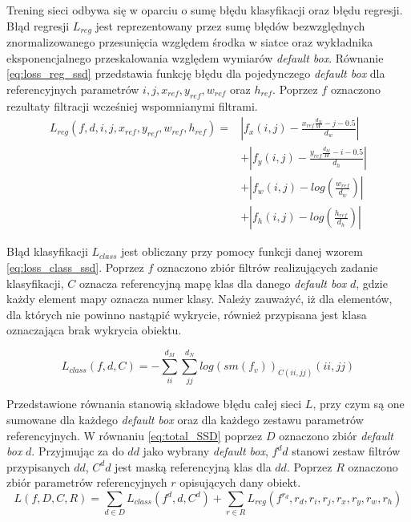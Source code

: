 Trening sieci odbywa się w oparciu o sumę błędu klasyfikacji oraz błędu regresji.
Błąd regresji $L_{reg}$ jest reprezentowany przez sumę błędów bezwzględnych znormalizowanego przesunięcia względem środka w siatce oraz wykładnika eksponencjalnego przeskalowania względem wymiarów \emph{default box}. 
Równanie \eqref{eq:loss_reg_ssd} przedstawia funkcję błędu dla pojedynczego \emph{default box} dla referencyjnych parametrów $i, j, x_{ref}, y_{ref}, w_{ref}$ oraz $h_{ref}$.
Poprzez $f$ oznaczono rezultaty filtracji wcześniej wspomnianymi filtrami.
\begin{equation}
\begin{aligned}
L_{reg}(f, d, i, j, x_{ref}, y_{ref}, w_{ref}, h_{ref}) 
=& |f_x(i,j) - \frac{x_{ref}\frac{d_N}{W} - j - 0.5}{d_w}| \\
&+ |f_y(i,j) - \frac{y_{ref}\frac{d_M}{H} - i - 0.5}{d_h}| \\
&+ |f_w(i,j) - log(\frac{w_{ref}}{d_w})|\\
&+ |f_h(i,j) - log(\frac{h_{ref}}{d_h})|
\end{aligned}
\label{eq:loss_reg_ssd}
\end{equation}

Błąd klasyfikacji $L_{class}$ jest obliczany przy pomocy funkcji danej wzorem \eqref{eq:loss_class_ssd}. Poprzez $f$ oznaczono zbiór filtrów realizujących zadanie klasyfikacji, $C$ oznacza referencyjną mapę klas dla danego \emph{default box} $d$, gdzie każdy element mapy oznacza numer klasy. Należy zauważyć, iż dla elementów, dla których nie powinno nastąpić wykrycie, również przypisana jest klasa oznaczająca brak wykrycia obiektu.

\begin{equation}
L_{class}(f,d,C) = 
-\sum_{ii}^{d_M}{\sum_{jj}^{d_N}
{log(sm(f_{v}))_{C(ii,jj)}(ii,jj)}
}
\label{eq:loss_class_ssd}
\end{equation}


Przedstawione równania stanowią składowe błędu całej sieci $L$, przy czym są one sumowane dla każdego \emph{default box} oraz dla każdego zestawu parametrów referencyjnych.
W równaniu \eqref{eq:total_SSD} poprzez $D$ oznaczono zbiór \emph{default box} $d$. 
Przyjmując za do $dd$ jako wybrany \emph{default box},  $f^dd$ stanowi zestaw filtrów przypisanych $dd$, $C^dd$ jest maską referencyjną klas dla $dd$. 
Poprzez $R$ oznaczono zbiór parametrów referencyjnych $r$ opisujących dany obiekt.
\begin{equation}
    L(f, D, C, R) = \sum_{d \in D} {L_{class}(f^d,d,C^d)} + \sum_{r \in R}{L_{reg}(f^{r_d},r_d,r_i,r_j,r_x,r_y,r_w,r_h)}
\label{eq:total_SSD}
\end{equation}

